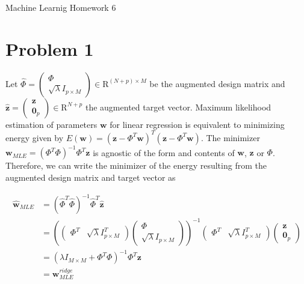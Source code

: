 \documentclass[12pt]{article}
\begin{document}
\begin{center}
{\Large Machine Learnig Homework 6} \\[.3in]
\end{center}
\vspace*{.5in}


\section*{Problem 1}

Let $\hat{\Phi} = \begin{pmatrix} \Phi \\ \sqrt{\lambda}I_{p \times M} \end{pmatrix} \in \mathrm{R}^{(N+p) \times M}$ be the augmented design matrix and $\hat{\mathbf{z}} = \begin{pmatrix} \mathbf{z} \\ \mathbf{0}_p \end{pmatrix} \in \mathrm{R}^{N+p}$ the augmented target vector. Maximum likelihood estimation of parameters $ \mathbf{w}$ for linear regression is equivalent to minimizing energy given by $E(\mathbf{w}) = (\mathbf{z} - \Phi^T\mathbf{w})^T(\mathbf{z} - \Phi^T\mathbf{w})$. The minimizer $\mathbf{w}_{MLE} = (\Phi^T\Phi)^{-1}\Phi^T\mathbf{z}$ is agnostic of the form and contents of $\mathbf{w}$, $\mathbf{z}$ or $\Phi$. Therefore, we can write the minimizer of the energy resulting from the augmented design matrix and target vector as 

\begin{equation}
\begin{align}
 \hat{\mathbf{w}}_{MLE} &= (\hat{\Phi}^T\hat{\Phi})^{-1}\hat{\Phi}^T\hat{\mathbf{z}} \\
	       &= \left( \begin{pmatrix} \Phi^T & \sqrt{\lambda}I_{p \times M}^T \end{pmatrix} \begin{pmatrix} \Phi \\ \sqrt{\lambda}I_{p \times M} \end{pmatrix} \right)^{-1} \begin{pmatrix} \Phi^T & \sqrt{\lambda}I_{p \times M}^T \end{pmatrix} \begin{pmatrix} \mathbf{z} \\ \mathbf{0}_p \end{pmatrix} \\
	       &= \left( \lambda I_{M \times M} + \Phi^T\Phi \right)^{-1} \Phi^T \mathbf{z} \\
	       &= \mathbf{w}_{MLE}^{ridge}
\end{align}
\end{equation}             
\end{document}
